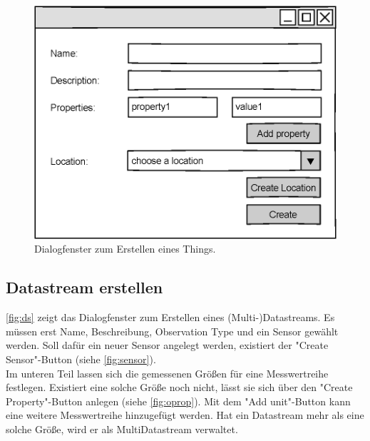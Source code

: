 \documentclass[12 pt]{article}
\begin{document}
\begin{figure}[htbp]
\centering
\includegraphics[scale=1]{images/thing}
\caption{\label{fig:thing}Dialogfenster zum Erstellen eines Things.}
\end{figure}


\subsection{Datastream erstellen}
\cref{fig:ds} zeigt das Dialogfenster zum Erstellen eines (Multi-)Datastreams. Es müssen erst Name, Beschreibung, Observation Type und ein Sensor gewählt werden. Soll dafür ein neuer Sensor angelegt werden, existiert der "{Create Sensor}"{-Button} (siehe \cref{fig:sensor}).\\

Im unteren Teil lassen sich die gemessenen Größen für eine Messwertreihe festlegen. Existiert eine solche Größe noch nicht, lässt sie sich über den "{Create Property}"{-Button} anlegen (siehe \cref{fig:oprop}). Mit dem "{Add unit}"{-Button} kann eine weitere Messwertreihe hinzugefügt werden. Hat ein Datastream mehr als eine solche Größe, wird er als MultiDatastream verwaltet.
\end{document}
